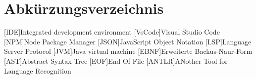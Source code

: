 \chapter*{Abkürzungsverzeichnis}

\begin{acronym}[LoRaWAN]

[IDE]{Integrated development environment}
[VsCode]{Visual Studio Code}
[NPM]{Node Package Manager}
[JSON]{JavaScript Object Notation}
[LSP]{Language Server Protocol}
[JVM]{Java virtual machine}
[EBNF]{Erweiterte Backus-Naur-Form}
[AST]{Abstract-Syntax-Tree}
[EOF]{End Of File}
[ANTLR]{ANother Tool for Language Recognition}


\end{acronym}
